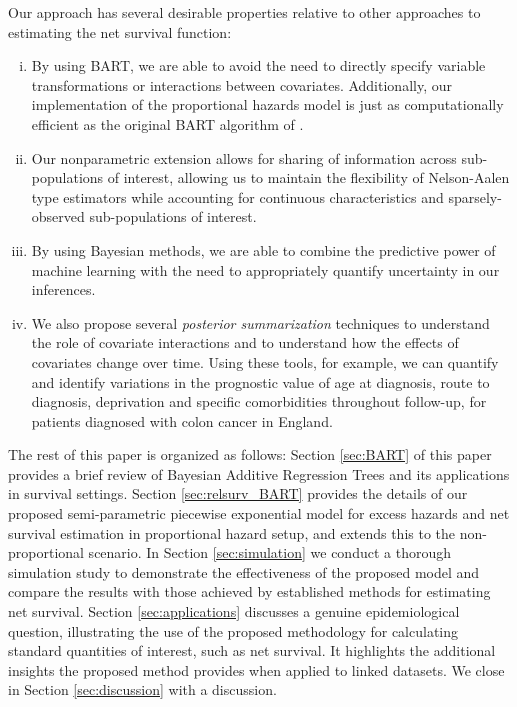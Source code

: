 \documentclass[12pt]{article}
\begin{document}
Our approach has several desirable properties relative to other approaches to estimating the net survival function:
\begin{enumerate}[i.]
    \item By using BART, we are able to avoid the need to directly specify variable transformations or interactions between covariates. Additionally, our implementation of the proportional hazards model is just as computationally efficient as the original BART algorithm of \citet{chipman2010bart}.
    \item Our nonparametric extension allows for sharing of information across sub-populations of interest, allowing us to maintain the flexibility of Nelson-Aalen type estimators while accounting for continuous characteristics and sparsely-observed sub-populations of interest.
    \item By using Bayesian methods, we are able to combine the predictive power of machine learning with the need to appropriately quantify uncertainty in our inferences.
    \item We also propose several \emph{posterior summarization} techniques to understand the role of covariate interactions and to understand how the effects of covariates change over time. Using these tools, for example, we can quantify and identify variations in the prognostic value of age at diagnosis, route to diagnosis, deprivation and specific comorbidities throughout follow-up, for patients diagnosed with colon cancer in England.
\end{enumerate}
    
The rest of this paper is organized as follows: Section \ref{sec:BART} of this paper provides a brief review of Bayesian Additive Regression Trees and its applications in survival settings. Section \ref{sec:relsurv_BART} provides the details of our proposed semi-parametric piecewise exponential model for excess hazards and net survival estimation in proportional hazard setup, and extends this to the non-proportional scenario. In Section \ref{sec:simulation} we conduct a thorough simulation study to demonstrate the effectiveness of the proposed model and compare the results with those achieved by established methods for estimating net survival. Section \ref{sec:applications} discusses a genuine epidemiological question, illustrating the use of the proposed methodology for calculating standard quantities of interest, such as net survival. It highlights the additional insights the proposed method provides when applied to linked datasets. We close in Section \ref{sec:discussion} with a discussion.
\end{document}
